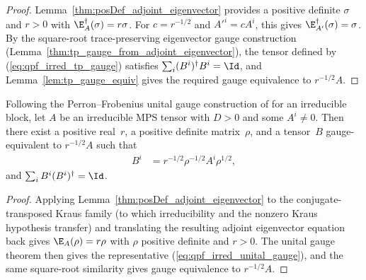 \begin{proof}\leanok
    Lemma~\ref{thm:posDef_adjoint_eigenvector} provides a positive definite
    $\sigma$ and $r > 0$ with $\E_A^\dagger(\sigma) = r\sigma$. For
    $c = r^{-1/2}$ and $A'^i = cA^i$, this gives $\E_{A'}^\dagger(\sigma) = \sigma$.
    By the square-root trace-preserving eigenvector gauge construction
    (Lemma~\ref{thm:tp_gauge_from_adjoint_eigenvector}), the tensor defined by
    (\ref{eq:qpf_irred_tp_gauge}) satisfies
    $\sum_i (B^i)^\dagger B^i = \Id$, and Lemma~\ref{lem:tp_gauge_equiv} gives
    the required gauge equivalence to $r^{-1/2}A$.
\end{proof}

\begin{lemma}%
    \label{thm:unital_data_irreducible}
    \leanok
    Following the Perron--Frobenius unital gauge construction of
    \cite[Theorem~4]{PerezGarcia2007Matrix} for an irreducible block, let $A$ be
    an irreducible MPS tensor with $D > 0$ and some $A^i \neq 0$.
    Then there exist a positive real~$r$, a positive definite matrix~$\rho$,
    and a tensor~$B$ gauge-equivalent to $r^{-1/2}A$ such that
    \begin{align}
        B^i
         & = r^{-1/2}\rho^{-1/2}A^i\rho^{1/2},
        \label{eq:qpf_irred_unital_gauge}
    \end{align}
    and $\sum_i B^i(B^i)^\dagger = \Id$.
\end{lemma}

\begin{proof}\leanok
    Applying Lemma~\ref{thm:posDef_adjoint_eigenvector} to the
    conjugate-transposed Kraus family (to which irreducibility and the nonzero
    Kraus hypothesis transfer) and translating the resulting adjoint eigenvector
    equation back gives $\E_A(\rho)=r\rho$ with $\rho$ positive definite and
    $r>0$. The unital gauge theorem then gives the representative
    (\ref{eq:qpf_irred_unital_gauge}), and the same square-root similarity
    gives gauge equivalence to $r^{-1/2}A$.
\end{proof}
